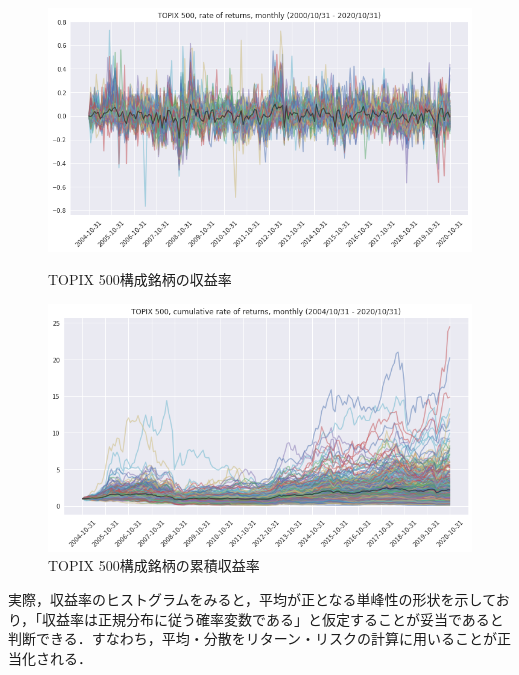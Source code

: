 \documentclass[dvipdfmx,autodetect-engine]{jsarticle}
\begin{document}
\begin{figure}[htbp]
    \begin{minipage}{0.5\hsize}
        \begin{center}
            \includegraphics[width=1.0\hsize]{./figures/topix500_chg_20041031-20201031.png}
            \caption{TOPIX 500構成銘柄の収益率}
            \label{fig:one}
        \end{center}
    \end{minipage}
    \begin{minipage}{0.5\hsize}
        \begin{center}
            \includegraphics[width=1.0\hsize]{./figures/topix500_cum_20041031-20201031.png}
            \caption{TOPIX 500構成銘柄の累積収益率}
            \label{fig:two}
        \end{center}
    \end{minipage}
\end{figure}

実際，収益率のヒストグラムをみると，平均が正となる単峰性の形状を示しており，「収益率は正規分布に従う確率変数である」と仮定することが妥当であると判断できる．すなわち，平均・分散をリターン・リスクの計算に用いることが正当化される．
\end{document}
